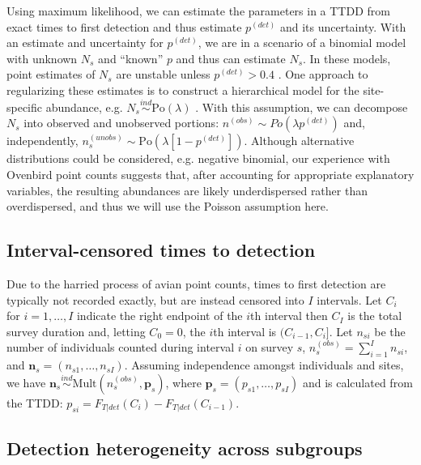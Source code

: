 \documentclass[12pt]{article}
\newcommand{\vn}{\textbf{n}}
\newcommand{\vp}{\textbf{p}}
\newcommand{\Po}{\mbox{Po}}
\newcommand{\Mult}{\mbox{Mult}}
\newcommand{\pdet}{p^{(det)}}
\newcommand{\ind}{\stackrel{ind}{\sim}}
\begin{document}
Using maximum likelihood, we can estimate the parameters in a TTDD from exact times to first detection and thus estimate $\pdet$ and its uncertainty.
With an estimate and uncertainty for $\pdet$, we are in a scenario of a binomial model with unknown $N_s$ and ``known'' $p$ and thus can estimate $N_s$.
In these models, point estimates of $N_s$ are unstable unless $\pdet>0.4$ \citep{Olkin1981}.
One approach to regularizing these estimates is to construct a hierarchical model for the site-specific abundance, e.g. $N_s\ind \Po(\lambda)$ \citep{Raftery1988, Royle2004NMixture}. 
With this assumption, we can decompose $N_{s}$ into observed and unobserved portions: $n^{(obs)} \sim Po(\lambda \pdet)$ and, independently, $n_{s}^{(unobs)} \sim \Po\left(\lambda[1-\pdet]\right)$.
Although alternative distributions could be considered, e.g. negative binomial, our experience with Ovenbird point counts suggests that, after accounting for appropriate explanatory variables, the resulting abundances are likely underdispersed rather than overdispersed, and thus we will use the Poisson assumption here. 


\subsection{Interval-censored times to detection} \label{s:interval}

Due to the harried process of avian point counts, times to first detection are typically not recorded exactly, but are instead censored into $I$ intervals. 
Let $C_i$ for $i=1,\dots,I$ indicate the right endpoint of the $i$th interval then $C_I$ is the total survey duration and, letting $C_0=0$, the $i$th interval is $(C_{i-1},C_{i}]$. 
Let $n_{si}$ be the number of individuals counted during interval $i$ on survey $s$, $n_{s}^{(obs)} = \sum_{i=1}^I n_{si}$, and $\vn_{s}=(n_{s1},\dots,n_{sI})$.
Assuming independence amongst individuals and sites, we have $\vn_{s} \ind \Mult \left(n_{s}^{(obs)}, \vp_{s}\right)$, where $\vp_{s}=(p_{s1},\dots,p_{sI})$ and is calculated from the TTDD: $p_{si} = F_{T|det}(C_i) - F_{T|det}(C_{i-1})$.  

\subsection{Detection heterogeneity across subgroups} \label{s:subgroups}
\end{document}
